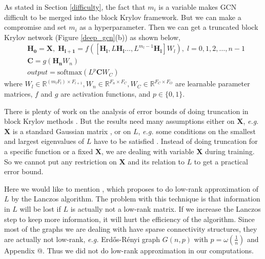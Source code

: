\documentclass{article}
\makeatletter
\newcommand\eg{\textit{e.g.}}
\newcommand*{\rom}[1]{\expandafter\@slowromancap\romannumeral #1@}
\makeatother
\begin{document}
As stated in Section \ref{difficulty}, the fact that $m_i$ is a variable makes GCN difficult to be merged into the block Krylov framework. But we can make a compromise and set $m_i$ as a hyperparameter. Then we can get a truncated block Krylov network (Figure \ref{deep_gcn}(b)) as shown below,
\begin{align}
&\bm{H_0} = \bm{X}, \; \bm{H_{l+1}}=f \left( \left[ \bm{H_l}, L \bm{H_l} \dots, L^{m_l -1} \bm{H_l} \right] W_l   \right), \; l=0,1,2,\dots,n - 1 \nonumber \\
& \bm{C} = g \left( \bm{H_n} W_n   \right)\\
&output = \text{softmax} \left(L^{p} \bm{C} W_C \right) \nonumber
\end{align}
where $W_l \in \mathbb{R}^{\left( m_l F_l \right)  \times F_{l+1} }, W_n \in \mathbb{R}^{ F_n \times F_C}, W_C \in \mathbb{R}^{F_C \times F_O}$ are learnable parameter matrices, $f$ and $g$ are activation functions, and $p \in \{0,1\}$.

There is plenty of work on the analysis of error bounds of doing truncation in block Krylov methods \cite{frommer2017block}. But the results need many assumptions either on $\bm{X}$, \eg{} $\bm{X}$ is a standard Gaussian matrix \cite{ wang2015improved}, or on  $L$, \eg{} some conditions on the smallest and largest eigenvalues of $L$  have to be satisfied \cite{musco2018stability}. Instead of doing truncation for a specific function or a fixed $\bm{X}$, we are dealing with variable $\bm{X}$ during training. So we cannot put any restriction on $\bm{X}$ and its relation to $L$ to get a practical error bound.

\begin{figure*}[htbp]
\centering
{}}
\hfill
\subfloat[Truncated Block Krylov]{
\captionsetup{justification = centering}
\texttt{[image: \{fig\_truncated\_krylov]}.pdf}}
\caption{Deep GCN Architectures}
\label{deep_gcn}
\end{figure*}

Here we would like to mention \cite{liao2019lanczos}, which proposes to do low-rank approximation of $L$ by the Lanczos algorithm. The problem with this technique is that information in $L$ will be lost if $L$ is actually not a low-rank matrix.  If we increase the Lanczos step to keep more information, it will hurt the efficiency of the algorithm. Since most of the graphs we are dealing with have sparse connectivity structures, they are actually not low-rank, \eg{} Erd\H{o}s-R\'enyi graph $G(n,p)$ with $p = \omega(\frac{1}{n})$ \cite{tran2013sparse} and Appendix \rom{4}.
Thus we did not do low-rank approximation in our computations.
\end{document}
